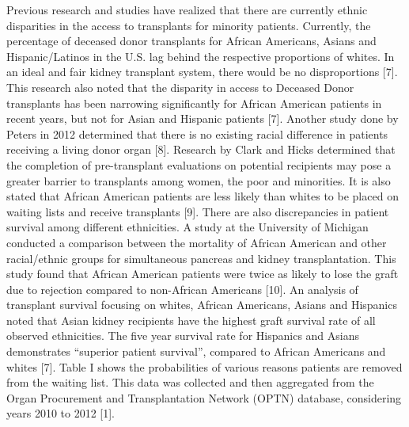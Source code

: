 \documentclass[9pt,a4paper,twocolumn]{scrartcl}
\begin{document}
Previous research and studies have realized that there are currently ethnic disparities in the access to transplants for minority patients.  Currently, the percentage of deceased donor transplants for African Americans, Asians and Hispanic/Latinos in the U.S. lag behind the respective proportions of whites.  In an ideal and fair kidney transplant system, there would be no disproportions [7].  This research also noted that the disparity in access to Deceased Donor transplants has been narrowing significantly for African American patients in recent years, but not for Asian and Hispanic patients [7].  
Another study done by Peters in 2012 determined that there is no existing racial difference in patients receiving a living donor organ [8].  Research by Clark and Hicks determined that the completion of pre-transplant evaluations on potential recipients may pose a greater barrier to transplants among women, the poor and minorities.  It is also stated that African American patients are less likely than whites to be placed on waiting lists and receive transplants [9].
There are also discrepancies in patient survival among different ethnicities.  A study at the University of Michigan conducted a comparison between the mortality of African American and other racial/ethnic groups for simultaneous pancreas and kidney transplantation.  This study found that African American patients were twice as likely to lose the graft due to rejection compared to non-African Americans [10].  An analysis of transplant survival focusing on whites, African Americans, Asians and Hispanics noted that Asian kidney recipients  have the highest graft survival rate of all observed ethnicities.  The five year survival rate for Hispanics and Asians demonstrates “superior patient survival”, compared to African Americans and whites [7].
Table I shows the probabilities of various reasons patients are removed from the waiting list.  This data was collected and then aggregated from the Organ Procurement and Transplantation Network (OPTN) database, considering years 2010 to 2012 [1].  
\end{document}
